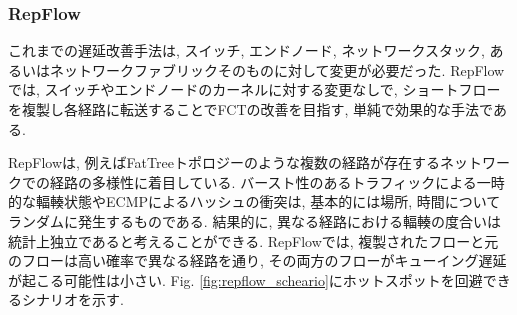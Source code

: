 \subsubsection{RepFlow}
これまでの遅延改善手法は, スイッチ, エンドノード, ネットワークスタック, あるいはネットワークファブリックそのものに対して変更が必要だった. 
RepFlow\cite{repflow}では, スイッチやエンドノードのカーネルに対する変更なしで,
ショートフローを複製し各経路に転送することでFCTの改善を目指す, 単純で効果的な手法である. 

RepFlowは, 例えばFatTreeトポロジー\cite{fattree}のような複数の経路が存在するネットワークでの経路の多様性に着目している.
バースト性のあるトラフィックによる一時的な輻輳状態やECMPによるハッシュの衝突は, 基本的には場所, 時間についてランダムに発生するものである. 
結果的に, 異なる経路における輻輳の度合いは統計上独立であると考えることができる. 
RepFlowでは, 複製されたフローと元のフローは高い確率で異なる経路を通り, その両方のフローがキューイング遅延が起こる可能性は小さい. 
Fig. \ref{fig:repflow_scheario}にホットスポットを回避できるシナリオを示す. 

